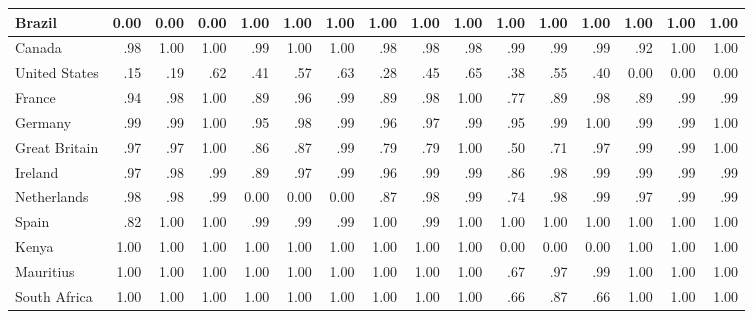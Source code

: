 \begin{table*}[t]
{\begin{tabular}{P{32mm}|d{3.2}d{3.2}d{3.2}|d{3.2}d{3.2}d{3.2}|d{3.2}d{3.2}d{3.2}|d{3.2}d{3.2}d{3.2}|d{3.2}d{3.2}d{3.2}}
Brazil               &0.00  &0.00   &0.00     &1.00 &1.00 &1.00   &1.00  &1.00  &1.00   &1.00 &1.00  &1.00  &1.00 &1.00 &1.00  \\ \midrule
Canada               &.98  &1.00   &1.00     &.99 &1.00 &1.00   &.98  &.98  &.98  &.99 &.99  &.99  &.92 &1.00  &1.00  \\
United States        &.15  &.19   &.62     &.41  &.57 &.63   &.28  &.45  &.65  &.38 &.55  &.40  &0.00  &0.00 &0.00  \\ \midrule
France               &.94   &.98  &1.00     &.89 &.96 &.99   &.89  &.98  &1.00  &.77 &.89  &.98  &.89 &.99 &.99  \\
Germany              &.99  &.99   &1.00     &.95 &.98 &.99   &.96  &.97  &.99  &.95 &.99  &1.00  &.99 &.99 &1.00  \\
Great Britain        &.97  &.97   &1.00     &.86 &.87 &.99   &.79  &.79  &1.00  &.50 &.71  &.97  &.99 &.99 &1.00  \\
Ireland              &.97   &.98  &.99     &.89 &.97 &.99   &.96 &.99   &.99  &.86 &.98  &.99  &.99 &.99 &.99  \\
Netherlands          &.98  &.98   &.99     &0.00 &0.00 &0.00   &.87  &.98  &.99  &.74  &.98 &.99  &.97 &.99 &.99  \\
Spain                &.82  &1.00   &1.00     &.99 &.99 &.99   &1.00  &.99  &1.00  &1.00  &1.00 &1.00  &1.00 &1.00  &1.00  \\ \midrule
Kenya                &1.00  &1.00   &1.00     &1.00 &1.00 &1.00   &1.00  &1.00  &1.00  &0.00 &0.00  &0.00  &1.00 &1.00  &1.00  \\
Mauritius            &1.00  &1.00   &1.00     &1.00 &1.00 &1.00   &1.00  &1.00  &1.00  &.67 &.97  &.99  &1.00 &1.00 &1.00  \\
South Africa         &1.00  &1.00   &1.00     &1.00 &1.00 &1.00   &1.00 &1.00   &1.00  &.66 &.87  &.66  &1.00 &1.00 &1.00  \\ \midrule

\end{tabular}}
\end{table*}
